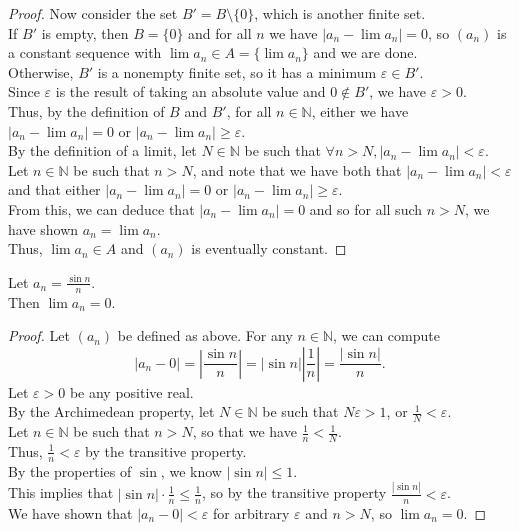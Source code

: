 \documentclass{article}
\newenvironment{theorem}[1]{\renewcommand\theinnercustomthm{#1}\innercustomthm}
  {\endinnercustomthm}
\begin{document}
\begin{proof}
    Now consider the set $B'=B \setminus \{0\}$, which is another finite set. \\
    If $B'$ is empty, then $B = \{0\}$ and for all $n$ we have $|a_n - \lim a_n| = 0$, so $(a_n)$ is a constant sequence with $\lim a_n \in A = \{\lim a_n\}$ and we are done. \\
    Otherwise, $B'$ is a nonempty finite set, so it has a minimum $\varepsilon \in B'$. \\Since $\varepsilon$ is the result of taking an absolute value and $0\not\in B'$, we have $\varepsilon > 0$. \\
    Thus, by the definition of $B$ and $B'$, for all $n \in \mathbb N$, either we have $|a_n - \lim a_n | = 0$ or $|a_n - \lim a_n | \ge \varepsilon$. \\
    By the definition of a limit, let $N\in \mathbb N$ be such that $\forall n > N, |a_n - \lim a_n | < \varepsilon$. \\
    Let $n \in \mathbb N$ be such that $n > N$, and note that we have both that $|a_n - \lim a_n| < \varepsilon$ and that either $|a_n - \lim a_n | = 0$ or $|a_n - \lim a_n| \ge \varepsilon$. \\
    From this, we can deduce that $|a_n - \lim a_n| = 0$ and so for all such $n>N$, we have shown $a_n = \lim a_n$.\\ 
    Thus, $\lim a_n \in A$ and $(a_n)$ is eventually constant.
\end{proof}

\newpage{}
\begin{theorem}2
    Let $a_n = \frac{\sin n}{n}$. \\
    Then $\lim a_n = 0$.
\end{theorem}
\begin{proof}
    Let $(a_n)$ be defined as above. For any $n \in \mathbb N$, we can compute \[|a_n - 0| = \left|\frac{\sin n}{n}\right| = \left|\sin n\right|\left|\frac{1}{n}\right| = \frac{|\sin n|}{n}.\]
    Let $\varepsilon > 0$ be any positive real. \\
    By the Archimedean property, let $N \in \mathbb N$ be such that $N\varepsilon > 1$, or $\frac{1}{N} < \varepsilon$. \\
    Let $n \in \mathbb N$ be such that $n > N$, so that we have $\frac{1}{n} < \frac{1}{N}$. \\
    Thus, $\frac{1}{n} < \varepsilon$ by the transitive property. \\
    By the properties of $\sin$, we know $|\sin n|\le 1$. \\
    This implies that $|\sin n|\cdot\frac{1}{n} \le \frac{1}{n}$, so by the transitive property $\frac{|\sin n|}{n} < \varepsilon$. \\
    We have shown that $|a_n - 0| < \varepsilon$ for arbitrary $\varepsilon$ and $n > N$, so $\lim a_n = 0$.
\end{proof}
\end{document}
